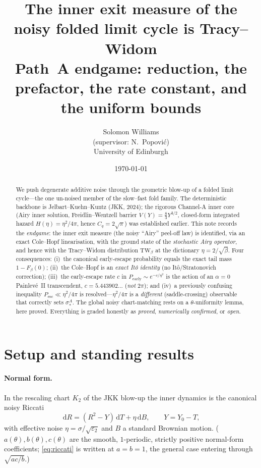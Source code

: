 \documentclass[11pt]{article}
\title{\textbf{The inner exit measure of the noisy folded limit cycle is Tracy--Widom}\\[2pt]
\large Path~A endgame: reduction, the prefactor, the rate constant, and the uniform bounds}
\author{Solomon Williams \\ \small (supervisor: N.\ Popovi\'c) \\ \small University of Edinburgh}
\date{\today}
\theoremstyle{remark}
\newcommand{\dd}{\,\mathrm{d}}
\newcommand{\TW}{\mathrm{TW}}
\newcommand{\Pearly}{P_{\mathrm{early}}}
\begin{document}
\maketitle

\begin{abstract}
\noindent
We push degenerate additive noise through the geometric blow-up of a folded limit
cycle---the one un-noised member of the slow--fast fold family. The deterministic
backbone is Jelbart--Kuehn--Kuntz (JKK, 2024); the rigorous Channel-A inner core
(Airy inner solution, Freidlin--Wentzell barrier $V(Y)=\tfrac83Y^{3/2}$, closed-form
integrated hazard $H(\eta)=\eta^2/4\pi$, hence $C_q=2\sqrt\pi$) was established
earlier. This note records the \emph{endgame}: the inner exit measure (the noisy
``Airy'' peel-off law) is identified, via an exact Cole--Hopf linearisation, with the
ground state of the \emph{stochastic Airy operator}, and hence with the Tracy--Widom
distribution $\TW_\beta$ at the dictionary $\eta=2/\sqrt\beta$. Four consequences:
(i)~the canonical early-escape probability equals the exact tail mass $1-F_\beta(0)$;
(ii)~the Cole--Hopf is an \emph{exact It\^o identity} (no It\^o/Stratonovich
correction); (iii)~the early-escape rate $c$ in $\Pearly\sim e^{-c/\eta^2}$ is the
action of an $\alpha=0$ Painlev\'e~II transcendent, $c=5.443902\ldots$ (\emph{not}
$2\pi$); and (iv)~a previously confusing inequality $P_{\mathrm{esc}}\ll\eta^2/4\pi$
is resolved---$\eta^2/4\pi$ is a \emph{different} (saddle-crossing) observable that
correctly sets $\sigma_*^A$. The global noisy chart-matching rests on a
$\theta$-uniformity lemma, here proved. Everything is graded honestly as
\emph{proved}, \emph{numerically confirmed}, or \emph{open}.
\end{abstract}

\section{Setup and standing results}\label{sec:setup}

\paragraph{Normal form.} In the rescaling chart $K_2$ of the JKK blow-up the inner
dynamics is the canonical noisy Riccati
\begin{equation}\label{eq:riccati}
  \dd R = (R^2 - Y)\dd T + \eta \dd B, \qquad Y = Y_0 - T,
\end{equation}
with effective noise $\eta=\sigma/\sqrt{\varepsilon_2}$ and $B$ a standard Brownian
motion. ($a(\theta),b(\theta),c(\theta)$ are the smooth, $1$-periodic, strictly
positive normal-form coefficients; \eqref{eq:riccati} is written at $a=b=1$, the
general case entering through $\sqrt{ac/b}$.)
\end{document}
